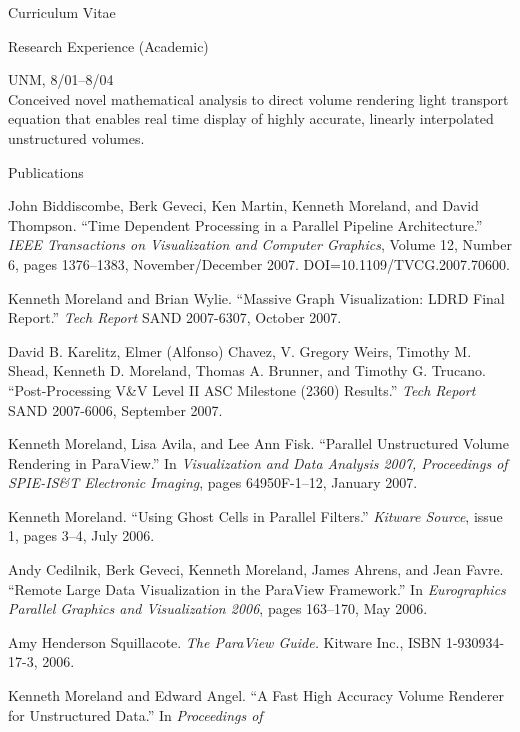 \documentclass{article}
\begin{document}
\begin{cv}{Curriculum Vitae}
    \begin{cvlist}{Research Experience (Academic)}
    \item[Doctoral Research] UNM, 8/01--8/04 \\
      Conceived novel mathematical analysis to direct volume rendering
      light transport equation that enables real time display of highly
      accurate, linearly interpolated unstructured volumes.
    \end{cvlist}

    \begin{cvlist}{Publications}
    \item John Biddiscombe, Berk Geveci, Ken Martin, Kenneth Moreland,
      and David Thompson.  ``Time Dependent Processing in a Parallel
      Pipeline Architecture.''  \emph{IEEE Transactions on Visualization
      and Computer Graphics}, Volume 12, Number 6, pages 1376--1383,
      November/December 2007.  DOI=10.1109/TVCG.2007.70600.
    \item Kenneth Moreland and Brian Wylie. ``Massive Graph
      Visualization: LDRD Final Report.''  \emph{Tech Report} SAND
      2007-6307, October 2007.
    \item David B. Karelitz, Elmer (Alfonso) Chavez, V. Gregory Weirs,
      Timothy M. Shead, Kenneth D. Moreland, Thomas A. Brunner, and Timothy
      G. Trucano.  ``Post-Processing V\&V Level II ASC Milestone (2360)
      Results.''  \emph{Tech Report} SAND 2007-6006, September 2007.
    \item Kenneth Moreland, Lisa Avila, and Lee Ann Fisk.  ``Parallel
      Unstructured Volume Rendering in ParaView.''  In
      \emph{Visualization and Data Analysis 2007, Proceedings of
      SPIE-IS\&T Electronic Imaging}, pages 64950F-1--12, January 2007.
    \item Kenneth Moreland.  ``Using Ghost Cells in Parallel Filters.''
      \emph{Kitware Source}, issue 1, pages 3--4, July 2006.
    \item Andy Cedilnik, Berk Geveci, Kenneth Moreland, James Ahrens, and
      Jean Favre.  ``Remote Large Data Visualization in the ParaView
      Framework.''  In \emph{Eurographics Parallel Graphics and
      Visualization 2006}, pages 163--170, May 2006.
    \item Amy Henderson Squillacote.  \emph{The ParaView Guide.}  Kitware
      Inc., ISBN 1-930934-17-3, 2006.
    \item Kenneth Moreland and Edward Angel.  ``A Fast High Accuracy
      Volume Renderer for Unstructured Data.''  In \emph{Proceedings of
}
\end{cvlist}
\end{cv}
\end{document}
